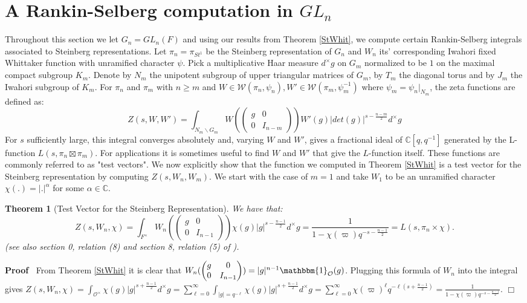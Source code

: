 \documentclass{article}
\newenvironment{proof}{\noindent\textbf{Proof\ }}{\hspace*{\fill}$\Box$\medskip}
\newtheorem{theorem}{Theorem}
\begin{document}
\section{A Rankin-Selberg computation in $GL_n$}
Throughout this section we let $G_n=GL_n(F)$ and using our results from Theorem \ref{StWhit}, we compute certain Rankin-Selberg integrals associated to Steinberg representations. Let $\pi_n=\pi_{St^1}$ be the Steinberg representation of $G_n$ and $W_n$ its' corresponding Iwahori fixed Whittaker function with unramified character $\psi$. Pick a multiplicative Haar measure $d^{\times}g$ on $G_m$ normalized to be $1$ on the maximal compact subgroup $K_m$. Denote by $N_m$ the unipotent subgroup of upper triangular matrices of $G_m$, by $T_m$ the diagonal torus and by $J_m$ the Iwahori subgroup of $K_m$.
For $\pi_n$ and $\pi_m$ with $n\geq m$ and $W\in\mathcal{W}(\pi_n,\psi_n), W'\in\mathcal{W}(\pi_m,\psi_m^{-1})$ where $\psi_m=\psi_n|_{N_m}$, the zeta functions are defined as:
$$Z(s,W,W')=\int_{N_m\backslash G_m}W(\begin{pmatrix}
    g & 0 \\
    0 & I_{n-m}
\end{pmatrix})W'(g)|det(g)|^{s-\frac{n-m}{2}}d^{\times}g$$
For $s$ sufficiently large, this integral converges absolutely and, varying $W$ and $W'$, gives a fractional ideal of $\mathbb{C}[q,q^{-1}]$ generated by the L-function $L(s,\pi_n\boxtimes\pi_m)$. For applications it is sometimes useful to find $W$ and $W'$ that give the $L$-function itself. These functions are commonly referred to as "test vectors". We now explicitly show that the function we computed in Theorem \ref{StWhit} is a test vector for the Steinberg representation by computing $Z(s,W_n,W_m)$. 
We start with the case of $m=1$ and take $W_1$ to be an unramified character $\chi(.)=|.|^{\alpha}$ for some $\alpha\in\mathbb{C}$.
\begin{theorem}[Test Vector for the Steinberg Representation] 


    We have that: $$Z(s,W_n,\chi)=\int_{F^{\times}}W_n(\begin{pmatrix}
    g & 0 \\
    0 & I_{n-1}
\end{pmatrix})\chi(g)|g|^{s-\frac{n-1}{2}}d^{\times}g=\frac{1}{1-\chi(\varpi)q^{-s-\frac{n-1}{2}}}=L(s,\pi_n\times\chi).$$ (see also section 0, relation (8) and section 8, relation (5) of \cite{JacShaPi}).
\end{theorem}
\begin{proof}
    From Theorem \ref{StWhit} it is clear that $W_n(\begin{pmatrix}
    g & 0 \\
    0 & I_{n-1}
\end{pmatrix})=|g|^{n-1}\mathbbm{1}_{\mathcal{O}}(g)$. Plugging this formula of $W_n$ into the integral gives $Z(s,W_n,\chi)=\int_{\mathcal{O}^{\times}}\chi(g)|g|^{s+\frac{n-1}{2}}d^{\times}g=\sum\limits_{\ell=0}^{\infty}\int_{|g|=q^{-\ell}}\chi(g)|g|^{s+\frac{n-1}{2}}d^{\times}g=\sum\limits_{\ell=0}^{\infty}\chi(\varpi)^{\ell}q^{-\ell(s+\frac{n-1}{2})}=\frac{1}{1-\chi(\varpi)q^{-s-\frac{n-1}{2}}}$.
\end{proof}
\end{document}
